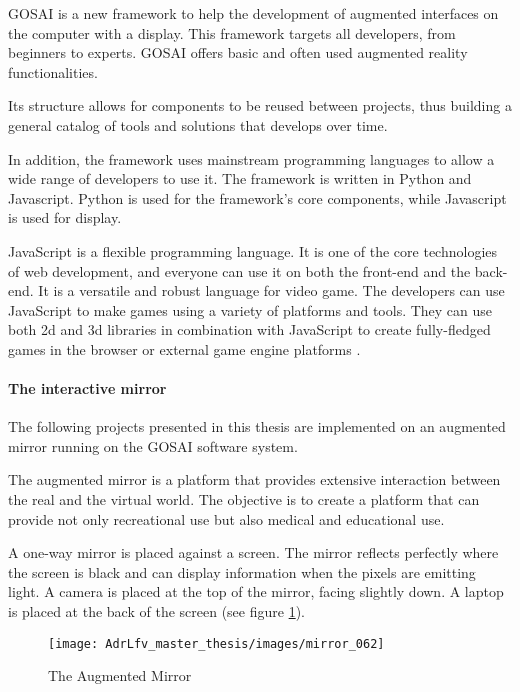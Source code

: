GOSAI is a new framework to help the development of augmented interfaces on the computer with a display. This framework targets all developers, from beginners to experts. GOSAI offers
basic and often used augmented reality functionalities.

Its structure allows for components to be reused between
projects, thus building a general catalog of tools and
solutions that develops over time.

In addition, the framework uses mainstream programming languages to allow a wide range of developers to
use it. The framework is written in Python and Javascript.
Python is used for the framework’s core components,
while Javascript is used for display.

JavaScript is a flexible programming language. It is one of the core
technologies of web development, and everyone can use it on both the
front-end and the back-end.
It is a versatile and robust language for video game. The developers can use JavaScript to make games using a variety of platforms and tools. They can use both 2d and 3d libraries in combination with JavaScript to create fully-fledged games in the browser or external game engine platforms \cite{javascriptgaming}.

\paragraph[short]{The interactive mirror}

The following projects presented in this thesis are implemented on an augmented mirror running on the GOSAI software system.

The augmented mirror is a platform that provides extensive interaction between the real and the virtual world. The objective is to create a platform that can provide not only recreational use but also medical and educational use.

A one-way mirror is placed against a screen. The mirror reflects perfectly where the screen is black and can display  information when the pixels are emitting light. A camera is placed at the top of the mirror, facing slightly down.  A laptop is placed at the back of the screen (see figure \ref{fig:mirror_062}).

\begin{figure}[h]
    \centering
    \texttt{[image: AdrLfv\_master\_thesis/images/mirror\_062]}
    \caption{The Augmented Mirror}
    \label{fig:mirror_062}
\end{figure}

